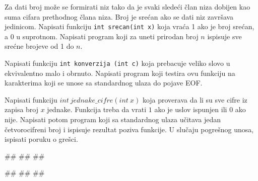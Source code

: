 \begin{Exercise}[label=v1.4_13] 
Za dati broj može se formirati niz tako da je svaki sledeći član niza dobijen
kao suma cifara prethodnog člana niza. Broj je srećan ako se dati niz završava 
jedinicom. Napisati funkciju 
\verb|int srecan(int x)|
 koja vraća 1 ako je broj srećan, a 0 u suprotnom. Napisati program koji za uneti prirodan broj $n$ ispisuje sve srećne brojeve od 1 do $n$.\\ 
\end{Exercise}
\begin{Answer}[ref=v1.4_13]
\end{Answer}

\begin{Exercise}[label=v1.4_14] 
Napisati funkciju 
\verb|int konverzija (int c)|
koja prebacuje veliko slovo u ekvivalentno malo i obrnuto. Napisati program koji testira ovu funkciju na karakterima koji se unose sa standardnog ulaza do pojave EOF.\\ 
\end{Exercise}
\begin{Answer}[ref=v1.4_14]
\end{Answer}



\iffalse
\item 
Napisati funkciju $int\ jednake\_cifre(int\ x)$ koja proverava da li su sve cifre iz zapisa broj $x$ jednake. Funkcija treba da vrati  $1$ ako je uslov ispunjen ili $0$ ako nije. Napisati potom program koji sa standardnog ulaza učitava jedan četvorocifreni broj i ispisuje rezultat poziva funkcije. U slučaju pogrešnog unosa, ispisati poruku o grešci. 

\begin{miditest}
\begin{upotreba}{1}
#\naslovInt#
##
##
\end{upotreba}
\end{miditest}

\begin{miditest}
\begin{upotreba}{2}
#\naslovInt#
##
##
\end{upotreba}
\end{miditest}


